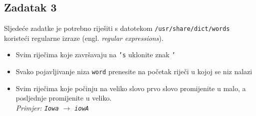 \documentclass[12pt,a4paper]{article}
\newcommand{\shell}[1]{\texttt{#1}}
\begin{document}
	\subsection*{Zadatak 3}
	Sljedeće zadatke je potrebno riješiti s datotekom \shell{/usr/share/dict/words} koristeći regularne izraze (engl. \emph{regular expressions}).
	\begin{itemize}
		\item Svim riječima koje završavaju na \shell{'s} uklonite znak \shell{'}
		\item Svako pojavljivanje niza \shell{word} prenesite na početak riječi u kojoj se niz nalazi
		\item Svim riječima koje počinju na veliko slovo prvo slovo promijenite u malo, a posljednje promijenite u veliko. \\ \emph{Primjer: \shell{Iowa} $\longrightarrow$ \shell{iowA}}
	\end{itemize}
	
\end{document}

